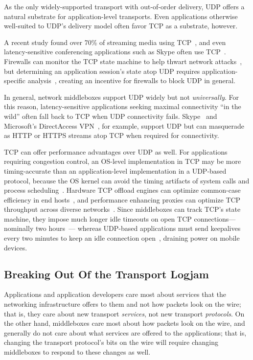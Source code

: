 As the only widely-supported transport
with out-of-order delivery,
UDP offers a natural
substrate for application-level transports.
Even applications otherwise well-suited to UDP's delivery model
often favor TCP as a substrate, however.

A recent study found over 70\% of streaming media using TCP~\cite{
	guo06delving},
and even latency-sensitive conferencing applications
such as Skype
often use TCP~\cite{baset06analysis}.
Firewalls can monitor the TCP state machine
to help thwart network attacks~\cite{handley01network},
but determining an application session's state atop UDP
requires application-specific analysis~\cite{northcutt05inside},
creating an incentive for firewalls to block UDP in general.

In general,
network middleboxes support UDP widely but not {\em universally}.
For this reason,
latency-sensitive applications
seeking maximal connectivity ``in the wild''
often fall back to TCP when UDP connectivity fails.
Skype~\cite{baset06analysis}
and Microsoft's Direct\-Access VPN~\cite{davies09directaccess},
for example,
support UDP but can masquerade
as HTTP or HTTPS streams atop TCP when required for connectivity.

TCP can offer performance advantages over UDP as well.
For applications requiring congestion control,
an OS-level implementation in TCP
may be more timing-accurate
than an application-level implementation in a UDP-based protocol,
because the OS kernel
can avoid the timing artifacts of 
system calls and process scheduling~\cite{zec02estimating}.
Hardware TCP offload engines
can optimize common-case efficiency
in end hosts~\cite{mogul03tcp},
and performance enhancing proxies
can optimize TCP throughput across diverse networks~\cite{
	rfc3234,cisco-rbscp}.
Since middleboxes can track TCP's state machine,
they impose much longer idle timeouts on open TCP connections---%
nominally two hours~\cite{rfc5382}---%
whereas UDP-based applications must send keepalives
every two minutes to keep an idle connection open~\cite{rfc4787},
draining power on mobile devices.

\subsection{Breaking Out Of the Transport Logjam}
Applications and application developers care most about 
services that the networking infrastructure offers to them
and not how packets look on the wire;
that is, they care about 
new transport {\em services}, not new transport {\em protocols}.
On the other hand,
middleboxes care most about how packets look on the wire,
and generally do not care about what services are offered to the applications;
that is, changing the transport protocol's bits on the wire
will require changing middleboxes to respond to these changes as well.

